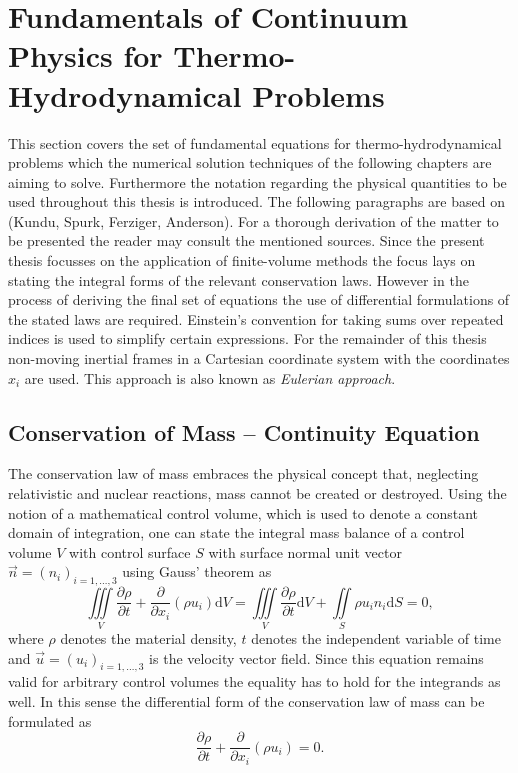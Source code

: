 
  \section{Fundamentals of Continuum Physics for Thermo-Hydrodynamical Problems}

      This section covers the set of fundamental equations for thermo-hydrodynamical problems which the numerical solution techniques of the following chapters are aiming to solve. Furthermore the notation regarding the physical quantities to be used throughout this thesis is introduced. The following paragraphs are based on (Kundu, Spurk, Ferziger, Anderson). For a thorough derivation of the matter to be presented the reader may consult the mentioned sources. Since the present thesis focusses on the application of finite-volume methods the focus lays on stating the integral forms of the relevant conservation laws. However in the process of deriving the final set of equations the use of differential formulations of the stated laws are required. Einstein's convention for taking sums over repeated indices is used to simplify certain expressions. For the remainder of this thesis non-moving inertial frames in a Cartesian coordinate system with the coordinates \( x_i \) are used. This approach is also known as \emph{Eulerian approach}.  

    \subsection{Conservation of Mass -- Continuity Equation}

    The conservation law of mass embraces the physical concept that, neglecting relativistic and nuclear reactions, mass cannot be created or destroyed. Using the notion of a mathematical control volume, which is used to denote a constant domain of integration, one can state the integral mass balance of a control volume \(V\) with control surface \(S\) with surface normal unit vector \(\vec{n} = \left( n_i \right)_{i=1,\dots,3}\) using Gauss' theorem as
    \begin{displaymath}
      \iiint\limits_V \frac{\partial \rho}{\partial t} + \frac{\partial}{\partial x_i}\left( \rho u_i \right) \mathrm{d}V 
      =  \iiint\limits_V \frac{\partial \rho}{\partial t} \mathrm{d}V + \iint\limits_S \rho u_i n_i \mathrm{d}S
      = 0,
    \end{displaymath}
    where \( \rho \) denotes the material density, \(t \) denotes the independent variable of time and \(\vec{u} = \left( u_i \right)_{i=1,\dots,3}\) is the velocity vector field. Since this equation remains valid for arbitrary control volumes the equality has to hold for the integrands as well. In this sense the differential form of the conservation law of mass can be formulated as
    \begin{equation}
      \label{eq:contifull}
      \frac{\partial \rho}{\partial t} + \frac{\partial}{\partial x_i}\left( \rho u_i \right)
      = 0.
    \end{equation}

